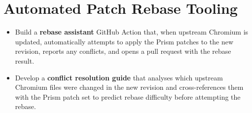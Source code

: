 \section{Automated Patch Rebase Tooling}
\begin{itemize}[leftmargin=*]
    \item Build a \textbf{rebase assistant} GitHub Action that, when upstream Chromium is updated, automatically attempts to apply the Prism patches to the new revision, reports any conflicts, and opens a pull request with the rebase result.
    \item Develop a \textbf{conflict resolution guide} that analyses which upstream Chromium files were changed in the new revision and cross-references them with the Prism patch set to predict rebase difficulty before attempting the rebase.
\end{itemize}
